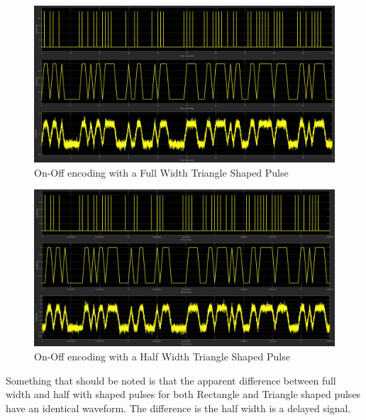 \documentclass{article}
\begin{document}
\begin{figure}[H]
  \includegraphics[width = \linewidth]{OO_Tri_F.jpg}
  \caption{On-Off encoding with a Full Width Triangle Shaped Pulse}
  \label{fig:OO-Tri-F}
\end{figure}
\begin{figure}[H]
  \includegraphics[width = \linewidth]{OO_Tri_H.jpg}
  \caption{On-Off encoding with a Half Width Triangle Shaped Pulse}
  \label{fig:OO-Tri-H}
\end{figure}
Something that should be noted is that the apparent difference between full width and half with shaped pulses for both Rectangle and Triangle shaped pulses have an identical waveform. The difference is the half width is a delayed signal.
\end{document}
